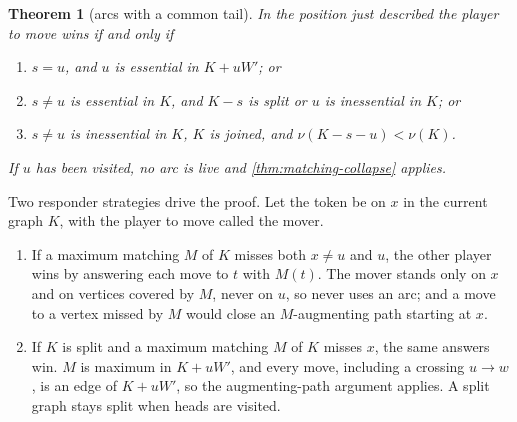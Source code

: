 \documentclass[11pt]{amsart}
\theoremstyle{plain}
\newtheorem{theorem}{Theorem}[section]
\theoremstyle{definition}
\theoremstyle{remark}
\numberwithin{equation}{section}
\begin{document}
\begin{theorem}[arcs with a common tail]\label{thm:common-tail}
In the position just described the player to move wins if and only if
\begin{enumerate}[label=\textup{(\arabic*)}]
\item $s=u$, and $u$ is essential in $K+uW'$; or
\item $s\neq u$ is essential in $K$, and $K-s$ is split or $u$ is inessential in $K$; or
\item $s\neq u$ is inessential in $K$, $K$ is joined, and $\nu(K-s-u)<\nu(K)$.
\end{enumerate}
If $u$ has been visited, no arc is live and \cref{thm:matching-collapse} applies.
\end{theorem}

Two responder strategies drive the proof. Let the token be on $x$ in the current graph $K$, with the player to move called the mover.

\begin{enumerate}[label=(T\arabic*$'$),start=2]
\item If a maximum matching $M$ of $K$ misses both $x\neq u$ and $u$, the other player wins by answering each move to $t$ with $M(t)$. The mover stands only on $x$ and on vertices covered by $M$, never on $u$, so never uses an arc; and a move to a vertex missed by $M$ would close an $M$-augmenting path starting at $x$.
\item If $K$ is split and a maximum matching $M$ of $K$ misses $x$, the same answers win. $M$ is maximum in $K+uW'$, and every move, including a crossing $u\to w$, is an edge of $K+uW'$, so the augmenting-path argument applies. A split graph stays split when heads are visited.
\end{enumerate}
\end{document}
